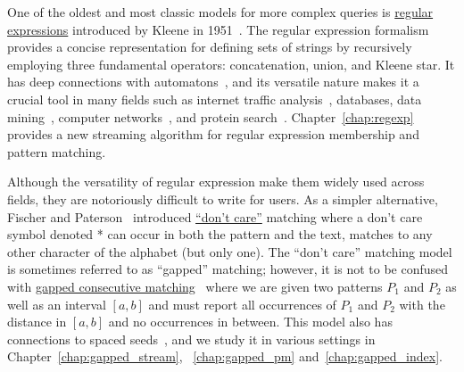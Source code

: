 One of the oldest and most classic models for more complex queries is \underline{regular expressions} introduced by Kleene in 1951~\cite{RM-704}.
The regular expression formalism provides a concise representation for defining sets of strings by recursively employing three fundamental operators: concatenation, union, and Kleene star.
It has deep connections with automatons~\cite{Thompson_automaton}, and its versatile nature makes it a crucial tool in many fields such as internet traffic analysis~\cite{4221791,4579527}, databases, data mining~\cite{1000341,10.5555/645927.672035,10.1145/375551.375569}, computer networks~\cite{10.1145/1159913.1159952}, and protein search~\cite{10.1145/369133.369220}. Chapter~\ref{chap:regexp} provides a new streaming algorithm for regular expression membership and pattern matching.

Although the versatility of regular expression make them widely used across fields, they are notoriously difficult to write for users.
As a simpler alternative, Fischer and Paterson~\cite{fischer1974string} introduced \underline{``don't care''} matching where a don't care symbol denoted * can occur in both the pattern and the text, matches to any other character of the alphabet (but only one).
The ``don't care'' matching model is sometimes referred to as ``gapped'' matching; however, it is not to be confused with \underline{gapped consecutive matching}~\cite{bille2022gapped} where we are given two patterns $P_1$ and $P_2$ as well as an interval $[a,b]$ and must report all occurrences of $P_1$ and $P_2$ with the distance in $[a,b]$ and no occurrences in between. This model also has connections to spaced seeds~\cite{burkhardt2003better}, and we study it in various settings in Chapter~\ref{chap:gapped_stream}, ~\ref{chap:gapped_pm} and~\ref{chap:gapped_index}.


